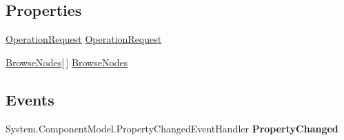 \subsection*{Properties}
\begin{DoxyCompactItemize}
\item 
\hypertarget{class_amazon___price___finder_1_1amazon_1_1ecs_1_1_browse_node_lookup_response_a821f0e9cbc82d6a29ee0f93a9ceed3ba}{\hyperlink{class_amazon___price___finder_1_1amazon_1_1ecs_1_1_operation_request}{Operation\-Request} \hyperlink{class_amazon___price___finder_1_1amazon_1_1ecs_1_1_browse_node_lookup_response_a821f0e9cbc82d6a29ee0f93a9ceed3ba}{Operation\-Request}}\label{class_amazon___price___finder_1_1amazon_1_1ecs_1_1_browse_node_lookup_response_a821f0e9cbc82d6a29ee0f93a9ceed3ba}

\begin{DoxyCompactList}\small\item\em \end{DoxyCompactList}\item 
\hypertarget{class_amazon___price___finder_1_1amazon_1_1ecs_1_1_browse_node_lookup_response_a107a46f5aaa79f5f90594ef077e10213}{\hyperlink{class_amazon___price___finder_1_1amazon_1_1ecs_1_1_browse_nodes}{Browse\-Nodes}\mbox{[}$\,$\mbox{]} \hyperlink{class_amazon___price___finder_1_1amazon_1_1ecs_1_1_browse_node_lookup_response_a107a46f5aaa79f5f90594ef077e10213}{Browse\-Nodes}}\label{class_amazon___price___finder_1_1amazon_1_1ecs_1_1_browse_node_lookup_response_a107a46f5aaa79f5f90594ef077e10213}

\begin{DoxyCompactList}\small\item\em \end{DoxyCompactList}\end{DoxyCompactItemize}
\subsection*{Events}
\begin{DoxyCompactItemize}
\item 
\hypertarget{class_amazon___price___finder_1_1amazon_1_1ecs_1_1_browse_node_lookup_response_a2e7860627f957bb7837b4a39329de025}{System.\-Component\-Model.\-Property\-Changed\-Event\-Handler {\bfseries Property\-Changed}}\label{class_amazon___price___finder_1_1amazon_1_1ecs_1_1_browse_node_lookup_response_a2e7860627f957bb7837b4a39329de025}

\end{DoxyCompactItemize}


